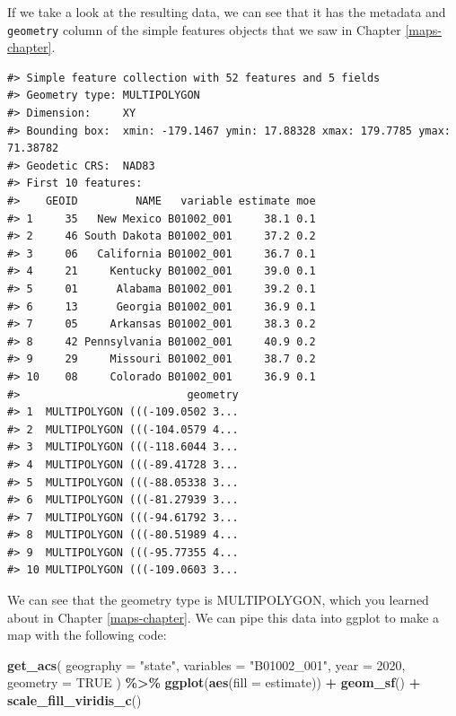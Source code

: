 \documentclass[
]{book}
\newenvironment{Shaded}{\begin{snugshade}}{\end{snugshade}}
\newcommand{\AttributeTok}[1]{\textcolor[rgb]{0.13,0.29,0.53}{#1}}
\newcommand{\ConstantTok}[1]{\textcolor[rgb]{0.56,0.35,0.01}{#1}}
\newcommand{\DecValTok}[1]{\textcolor[rgb]{0.00,0.00,0.81}{#1}}
\newcommand{\FunctionTok}[1]{\textcolor[rgb]{0.13,0.29,0.53}{\textbf{#1}}}
\newcommand{\NormalTok}[1]{#1}
\newcommand{\SpecialCharTok}[1]{\textcolor[rgb]{0.81,0.36,0.00}{\textbf{#1}}}
\newcommand{\StringTok}[1]{\textcolor[rgb]{0.31,0.60,0.02}{#1}}
\begin{document}
If we take a look at the resulting data, we can see that it has the metadata and \texttt{geometry} column of the simple features objects that we saw in Chapter \ref{maps-chapter}.

\begin{verbatim}
#> Simple feature collection with 52 features and 5 fields
#> Geometry type: MULTIPOLYGON
#> Dimension:     XY
#> Bounding box:  xmin: -179.1467 ymin: 17.88328 xmax: 179.7785 ymax: 71.38782
#> Geodetic CRS:  NAD83
#> First 10 features:
#>    GEOID         NAME   variable estimate moe
#> 1     35   New Mexico B01002_001     38.1 0.1
#> 2     46 South Dakota B01002_001     37.2 0.2
#> 3     06   California B01002_001     36.7 0.1
#> 4     21     Kentucky B01002_001     39.0 0.1
#> 5     01      Alabama B01002_001     39.2 0.1
#> 6     13      Georgia B01002_001     36.9 0.1
#> 7     05     Arkansas B01002_001     38.3 0.2
#> 8     42 Pennsylvania B01002_001     40.9 0.2
#> 9     29     Missouri B01002_001     38.7 0.2
#> 10    08     Colorado B01002_001     36.9 0.1
#>                          geometry
#> 1  MULTIPOLYGON (((-109.0502 3...
#> 2  MULTIPOLYGON (((-104.0579 4...
#> 3  MULTIPOLYGON (((-118.6044 3...
#> 4  MULTIPOLYGON (((-89.41728 3...
#> 5  MULTIPOLYGON (((-88.05338 3...
#> 6  MULTIPOLYGON (((-81.27939 3...
#> 7  MULTIPOLYGON (((-94.61792 3...
#> 8  MULTIPOLYGON (((-80.51989 4...
#> 9  MULTIPOLYGON (((-95.77355 4...
#> 10 MULTIPOLYGON (((-109.0603 3...
\end{verbatim}

We can see that the geometry type is MULTIPOLYGON, which you learned about in Chapter \ref{maps-chapter}. We can pipe this data into ggplot to make a map with the following code:

\begin{Shaded}
\begin{Highlighting}[]
\FunctionTok{get\_acs}\NormalTok{(}
  \AttributeTok{geography =} \StringTok{"state"}\NormalTok{,}
  \AttributeTok{variables =} \StringTok{"B01002\_001"}\NormalTok{,}
  \AttributeTok{year =} \DecValTok{2020}\NormalTok{,}
  \AttributeTok{geometry =} \ConstantTok{TRUE}
\NormalTok{) }\SpecialCharTok{\%\textgreater{}\%}
  \FunctionTok{ggplot}\NormalTok{(}\FunctionTok{aes}\NormalTok{(}\AttributeTok{fill =}\NormalTok{ estimate)) }\SpecialCharTok{+}
  \FunctionTok{geom\_sf}\NormalTok{() }\SpecialCharTok{+}
  \FunctionTok{scale\_fill\_viridis\_c}\NormalTok{()}
\end{Highlighting}
\end{Shaded}
\end{document}
